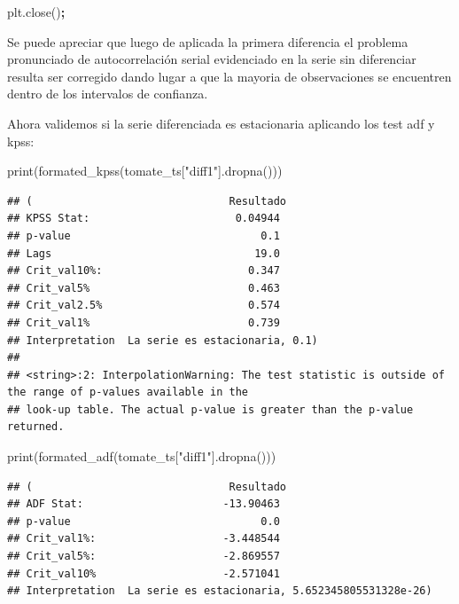 \documentclass[
]{book}
\newenvironment{Shaded}{\begin{snugshade}}{\end{snugshade}}
\newcommand{\BuiltInTok}[1]{#1}
\newcommand{\NormalTok}[1]{#1}
\newcommand{\OperatorTok}[1]{\textcolor[rgb]{0.81,0.36,0.00}{\textbf{#1}}}
\newcommand{\StringTok}[1]{\textcolor[rgb]{0.31,0.60,0.02}{#1}}
\begin{document}
\begin{Shaded}
\begin{Highlighting}[]
\NormalTok{plt.close()}\OperatorTok{;}
\end{Highlighting}
\end{Shaded}

Se puede apreciar que luego de aplicada la primera diferencia el problema pronunciado de autocorrelación serial evidenciado en la serie sin diferenciar resulta ser corregido dando lugar a que la mayoria de observaciones se encuentren dentro de los intervalos de confianza.

Ahora validemos si la serie diferenciada es estacionaria aplicando los test adf y kpss:

\begin{Shaded}
\begin{Highlighting}[]

\BuiltInTok{print}\NormalTok{(formated\_kpss(tomate\_ts[}\StringTok{"diff1"}\NormalTok{].dropna()))}
\end{Highlighting}
\end{Shaded}

\begin{verbatim}
## (                               Resultado
## KPSS Stat:                       0.04944
## p-value                              0.1
## Lags                                19.0
## Crit_val10%:                       0.347
## Crit_val5%                         0.463
## Crit_val2.5%                       0.574
## Crit_val1%                         0.739
## Interpretation  La serie es estacionaria, 0.1)
## 
## <string>:2: InterpolationWarning: The test statistic is outside of the range of p-values available in the
## look-up table. The actual p-value is greater than the p-value returned.
\end{verbatim}

\begin{Shaded}
\begin{Highlighting}[]
\BuiltInTok{print}\NormalTok{(formated\_adf(tomate\_ts[}\StringTok{"diff1"}\NormalTok{].dropna()))}
\end{Highlighting}
\end{Shaded}

\begin{verbatim}
## (                               Resultado
## ADF Stat:                      -13.90463
## p-value                              0.0
## Crit_val1%:                    -3.448544
## Crit_val5%:                    -2.869557
## Crit_val10%                    -2.571041
## Interpretation  La serie es estacionaria, 5.652345805531328e-26)
\end{verbatim}
\end{document}
